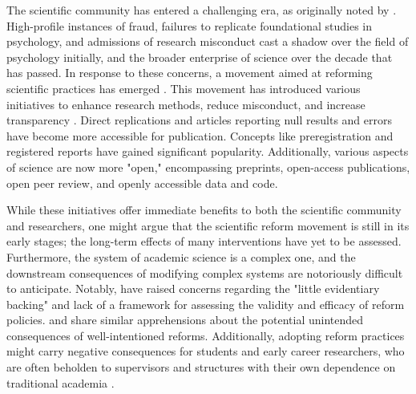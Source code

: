\documentclass[authordate, editorial, noabstract, issue]{jote-new-article}
\author[1]{\mbox{Sarahanne Field\orcid{0000-0001-7874-1261}}}
\affil[1]{University of Groningen}
\author[2]{\mbox{Noah van Dongen\orcid{0000-0003-0387-7388}}}
\affil[2]{University of Amsterdam}
\author[3]{\mbox{Leonid Tiokhin\orcid{0000-0001-7333-0383}}}
\affil[3]{IG\&H: Utrecht}
\begin{document}
\begin{frontmatter}
  \maketitle
  \begin{abstract}
    \printabstracttext
  \end{abstract}
\end{frontmatter}












The scientific community has entered a challenging era, as originally noted by \textcite{Wagenmakers2012}. High-profile instances of fraud, failures to replicate foundational studies in psychology, and admissions of research misconduct \parencites[e.g.,][]{John2012} cast a shadow over the field of psychology initially, and the broader enterprise of science over the decade that has passed. In response to these concerns, a movement aimed at reforming scientific practices has emerged \parencites{Field2022}{Munafo2017}{Spellman2018}. This movement has introduced various initiatives to enhance research methods, reduce misconduct, and increase transparency \parencites[see][for an overview]{van2023perspectives}. Direct replications and articles reporting null results and errors \parencites[such as the\emph{ Journal of Trial and Error}; see][]{Devine_2020} have become more accessible for publication. Concepts like preregistration and registered reports have gained significant popularity. Additionally, various aspects of science are now more "open," encompassing preprints, open-access publications, open peer review, and openly accessible data and code.



While these initiatives offer immediate benefits to both the scientific community and researchers, one might argue that the scientific reform movement is still in its early stages; the long-term effects of many interventions have yet to be assessed. Furthermore, the system of academic science is a complex one, and the downstream consequences of modifying complex systems are notoriously difficult to anticipate. Notably, \textcite{Devezer2020} have raised concerns regarding the "little evidentiary backing" and lack of a framework for assessing the validity and efficacy of reform policies. \textcite{Ioannidis2014} and \textcite{Tiokhin2021} share similar apprehensions about the potential unintended consequences of well-intentioned reforms. Additionally, adopting reform practices might carry negative consequences for students and early career researchers, who are often beholden to supervisors and structures with their own dependence on traditional academia \parencites{Field2023}.
\end{document}

